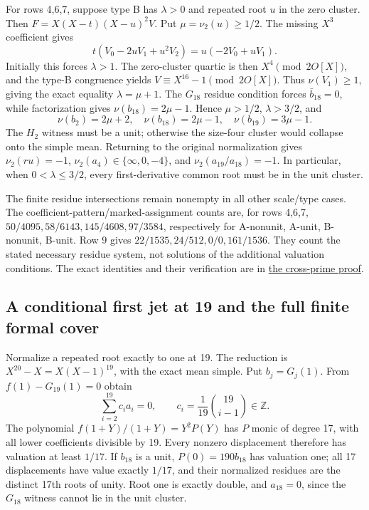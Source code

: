 \documentclass[
  british,
  10pt,
]{article}
\newcounter{none} %
\begin{document}
For rows 4,6,7, suppose type B has \(\lambda>0\) and repeated root \(u\)
in the zero cluster. Then \(F=X(X-t)(X-u)^2V\). Put
\(\mu=\nu_2(u)\ge1/2\). The missing \(X^3\) coefficient gives \[
 t(V_0-2uV_1+u^2V_2)=u(-2V_0+uV_1).
\] Initially this forces \(\lambda>1\). The zero-cluster quartic is then
\(X^4\pmod{2O[X]}\), and the type-B congruence yields
\(V\equiv X^{16}-1\pmod{2O[X]}\). Thus \(\nu(V_1)\ge1\), giving the
exact equality \(\lambda=\mu+1\). The \(G_{18}\) residue condition
forces \(\bar b_{18}=0\), while factorization gives
\(\nu(b_{18})=2\mu-1\). Hence \(\mu>1/2\), \(\lambda>3/2\), and \[
 \nu(b_2)=2\mu+2,\quad \nu(b_{18})=2\mu-1,\quad
 \nu(b_{19})=3\mu-1.
\] The \(H_2\) witness must be a unit; otherwise the size-four cluster
would collapse onto the simple mean. Returning to the original
normalization gives \(\nu_2(ru)=-1\), \(\nu_2(a_4)\in\{\infty,0,-4\}\),
and \(\nu_2(a_{19}/a_{18})=-1\). In particular, when
\(0<\lambda\le3/2\), every first-derivative common root must be in the
unit cluster.

The finite residue intersections remain nonempty in all other scale/type
cases. The coefficient-pattern/marked-assignment counts are, for rows
4,6,7, \(50/4095,58/6143,145/4608,97/3584\), respectively for A-nonunit,
A-unit, B-nonunit, B-unit. Row 9 gives \(22/1535,24/512,0/0,161/1536\).
They count the stated necessary residue system, not solutions of the
additional valuation conditions. The exact identities and their
verification are in
\href{evidence/full/cross_prime/CROSS_PRIME_RESTRICTIONS.md}{the
cross-prime proof}.

\subsection{A conditional first jet at 19 and the full finite formal
cover}\label{a-conditional-first-jet-at-19-and-the-full-finite-formal-cover}

Normalize a repeated root exactly to one at 19. The reduction is
\(X^{20}-X=X(X-1)^{19}\), with the exact mean simple. Put
\(b_j=G_j(1)\). From \(f(1)-G_{19}(1)=0\) obtain \[
 \sum_{i=2}^{19}c_i a_i=0,\qquad
 c_i=\frac1{19}\binom{19}{i-1}\in\mathbb Z.               \tag{D13}
\] The polynomial \(f(1+Y)/(1+Y)=Y^2P(Y)\) has \(P\) monic of degree 17,
with all lower coefficients divisible by 19. Every nonzero displacement
therefore has valuation at least \(1/17\). If \(b_{18}\) is a unit,
\(P(0)=190b_{18}\) has valuation one; all 17 displacements have value
exactly \(1/17\), and their normalized residues are the distinct 17th
roots of unity. Root one is exactly double, and \(a_{18}=0\), since the
\(G_{18}\) witness cannot lie in the unit cluster.
\end{document}
